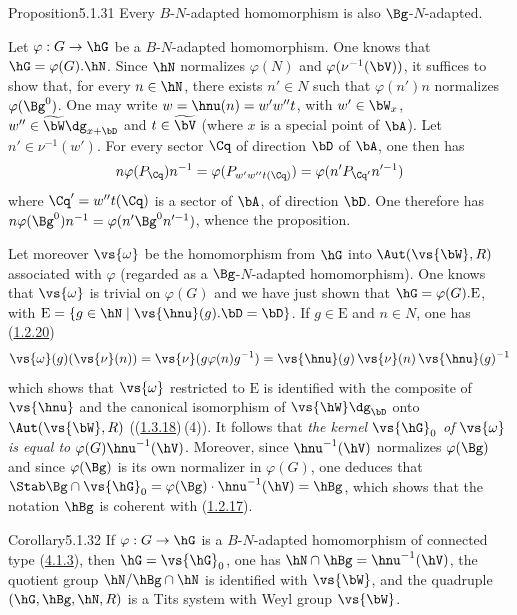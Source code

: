 \documentclass[12pt,a4paper,oneside,english]{smfart}
\makeatletter
\newcommand{\btanchor}[1]{\leavevmode\Hy@raisedlink{\hypertarget{bt:#1}{}}}
\newcommand{\btref}[1]{\hyperlink{bt:#1}{#1}}
\theoremstyle{definition}
\theoremstyle{bt}
\makeatother
\begin{document}
\begin{btstat}{Proposition}{5.1.31}\btanchor{5.1.31}
Every $B$-$N$-adapted homomorphism is also $\Bg$-$N$-adapted.
\end{btstat}

Let $\varphi:G\to\hG$ be a $B$-$N$-adapted homomorphism. One knows that
$\hG=\varphi(G).\hN$. Since $\hN$ normalizes $\varphi(N)$ and
$\varphi(\nu^{-1}(\bV))$, it suffices to show that, for every $n\in\hN$, there
exists $n'\in N$ such that $\varphi(n')n$ normalizes $\varphi(\Bg^{0})$. One may
write $w=\hnu(n)=w'w''t$, with $w'\in\bW_{x}$,
$w''\in\widetilde{\bW}\dg_{x+\bD}$ and $t\in\widetilde{\bV}$ (where $x$ is a
special point of $\bA$). Let $n'\in\nu^{-1}(w')$. For every sector $\Cq$ of
direction $\bD$ of $\bA$, one then has
\[
n\varphi(P_{\Cq})n^{-1}=\varphi(P_{w'w''t(\Cq)})=\varphi(n'P_{\Cq'}n'^{-1})
\]
where $\Cq'=w''t(\Cq)$ is a sector of $\bA$, of direction $\bD$. One therefore
has $n\varphi(\Bg^{0})n^{-1}=\varphi(n'\Bg^{0}n'^{-1})$, whence the proposition.

\medskip
Let moreover $\vs{\omega}$ be the homomorphism from $\hG$ into
$\Aut(\vs{\bW},R)$ associated with $\varphi$ (regarded as a $\Bg$-$N$-adapted
homomorphism). One knows that $\vs{\omega}$ is trivial on $\varphi(G)$ and we
have just shown that $\hG=\varphi(G).\mathrm{E}$, with
$\mathrm{E}=\{g\in\hN\mid \vs{\hnu}(g).\bD=\bD\}$. If $g\in \mathrm{E}$ and
$n\in N$, one has (\btref{1.2.20})
\[
\vs{\omega}(g)(\vs{\nu}(n))=\vs{\nu}(g\varphi(n)g^{-1})
=\vs{\hnu}(g)\,\vs{\nu}(n)\,\vs{\hnu}(g)^{-1}
\]
which shows that $\vs{\omega}$ restricted to $\mathrm{E}$ is identified with the
composite of $\vs{\hnu}$ and the canonical isomorphism of
$\vs{\hW}\dg_{\bD}$ onto $\Aut(\vs{\bW},R)$ ((\btref{1.3.18})\,(4)). It follows that
\emph{the kernel $\vs{\hG}_{0}$ of $\vs{\omega}$ is equal to
$\varphi(G)\hnu^{-1}(\hV)$}. Moreover, since $\hnu^{-1}(\hV)$ normalizes
$\varphi(\Bg)$ and since $\varphi(\Bg)$ is its own normalizer in $\varphi(G)$,
one deduces that
$\Stab\Bg\cap\vs{\hG}_{0}=\varphi(\Bg)\cdot\hnu^{-1}(\hV)=\hBg$, which shows
that the notation $\hBg$ is coherent with (\btref{1.2.17}).

\begin{btstat}{Corollary}{5.1.32}\btanchor{5.1.32}
If $\varphi:G\to\hG$ is a $B$-$N$-adapted homomorphism of connected type
\textup{(\btref{4.1.3})}, then $\hG=\vs{\hG}_{0}$, one has
$\hN\cap\hBg=\hnu^{-1}(\hV)$, the quotient group $\hN/\hBg\cap\hN$ is
identified with $\vs{\bW}$, and the quadruple $(\hG,\hBg,\hN,R)$ is a Tits
system with Weyl group $\vs{\bW}$.
\end{btstat}
\end{document}

